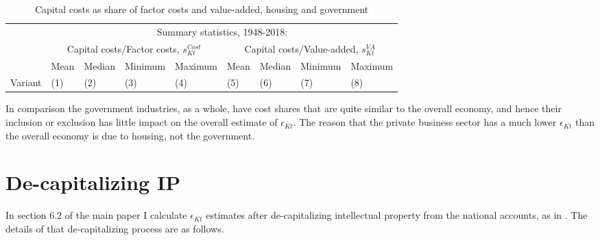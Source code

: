 \documentclass[11pt]{article}
\begin{document}
\begin{table}[!htb]
\begin{center}
\caption{Capital costs as share of factor costs and value-added, housing and government}
\label{TAB_ratios}
{\footnotesize
\begin{tabularx}{\textwidth}{lXXXXXXXX}
\midrule
        & \multicolumn{8}{c}{Summary statistics, 1948-2018:} \\ \cmidrule(lr){2-9} 
        & \multicolumn{4}{c}{Capital costs/Factor costs, $s^{Cost}_{Kt}$} & \multicolumn{4}{c}{Capital costs/Value-added, $s^{VA}_{Kt}$} \\ \cmidrule(lr){2-5} \cmidrule(lr){6-9} 
 &  Mean & Median  & Minimum & Maximum  &  Mean & Median  & Minimum & Maximum \\
Variant & (1) & (2) & (3) & (4) & (5) & (6) & (7) & (8) \\
\midrule

\midrule
\end{tabularx}
}
\end{center}
\vspace{-.5cm}
\end{table}

In comparison the government industries, as a whole, have cost shares that are quite similar to the overall economy, and hence their inclusion or exclusion has little impact on the overall estimate of $\epsilon_{Kt}$. The reason that the private business sector has a much lower $\epsilon_{Kt}$ than the overall economy is due to housing, not the government.

\section{De-capitalizing IP}
In section 6.2 of the main paper I calculate $\epsilon_{Kt}$ estimates after de-capitalizing intellectual property from the national accounts, as in \cite{ksz2020}. The details of that de-capitalizing process are as follows.
\end{document}
